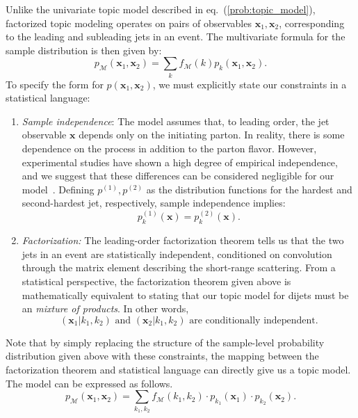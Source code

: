 \documentclass[a4paper,11pt]{article}
\newcommand{\bbm}[1]{\mathbf{#1}}
\newcommand{\bv}[1]{\bbm{#1}}
\DeclareRobustCommand{\Eq}[1]{eq.~(\ref{#1})}
\begin{document}
Unlike the univariate topic model described in \Eq{prob:topic_model}, factorized topic modeling operates on pairs of observables $\bv{x}_1, \bv{x}_2$, corresponding to the leading and subleading jets in an event.
The multivariate formula for the sample distribution is then given by:
\begin{equation}
\label{eq:multivar_topic_model}
p_\mathcal{M}(\bv{x}_1, \bv{x}_2) = \sum_k f_\mathcal{M}(k) p_k(\bv{x}_1, \bv{x}_2).
\end{equation}
To specify the form for $p(\bv{x}_1, \bv{x}_2)$, we must explicitly state our constraints in a statistical language:
\begin{enumerate}
\item \emph{Sample independence}: The model assumes that, to leading order, the jet observable $\bv{x}$ depends only on the initiating parton.
In reality, there is some dependence on the process in addition to the parton flavor.
However, experimental studies have shown a high degree of empirical independence, and we suggest that these differences can be considered negligible for our model~\cite{Komiske:2018vkc}.
Defining $p^{(1)}, p^{(2)}$ as the distribution functions for the hardest and second-hardest jet, respectively, sample independence implies:
\begin{equation}
p^{(1)}_k(\bv{x}) = p^{(2)}_k(\bv{x}).
\end{equation}
\item \emph{Factorization:} The leading-order factorization theorem tells us that the two jets in an event are statistically independent, conditioned on convolution through the matrix element describing the short-range scattering.
From a statistical perspective, the factorization theorem given above is mathematically equivalent to stating that our topic model for dijets must be an \emph{mixture of products}.
In other words,
\begin{equation}
(\bv{x}_1 | k_1, k_2) \text { and } (\bv{x}_2 | k_1, k_2) \text{ are conditionally independent.}
\end{equation}
\end{enumerate}

Note that by simply replacing the structure of the sample-level probability distribution given above with these constraints, the mapping between the factorization theorem and statistical language can directly give us a topic model.
The model can be expressed as follows.
\begin{equation}
\label{eq:finalfactorizedmodel}
p_\mathcal{M}(\bv{x}_1, \bv{x}_2) = \sum_{k_1, k_2} f_\mathcal{M}(k_1, k_2) \cdot p_{k_1}(\bv{x}_1) \cdot p_{k_2}(\bv{x}_2).
\end{equation}
\end{document}
